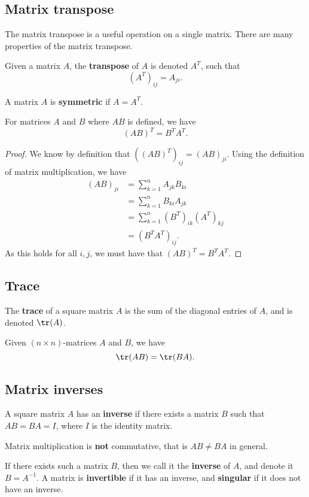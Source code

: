 \documentclass[a4paper]{article}
\begin{document}
\subsection{Matrix transpose}
The matrix transpose is a useful operation on a single matrix. There are many properties of the matrix transpose.
\begin{definition}
  Given a matrix $A$, the \textbf{transpose} of $A$ is denoted $A^T$, such that \[
    (A^T)_{ij} = A_{ji}
  .\] 
\end{definition}
\begin{definition}
  A matrix $A$ is \textbf{symmetric} if $A = A^T$.
\end{definition}
\begin{theorem}
  For matrices $A$ and $B$ where $AB$ is defined, we have  \[
    (AB)^T = B^TA^T
  .\] 
\end{theorem}
\begin{proof}
  We know by definition that $((AB)^T)_{ij} = (AB)_{ji}$. Using the definition of matrix multiplication, we have 
  \begin{align*}
    (AB)_{ji} &= \sum_{k = 1}^{n} A_{jk}B_{ki} \\
              &= \sum_{k=1}^{n} B_{ki}A_{jk} \\
              &= \sum_{k=1}^{n} (B^T)_{ik}(A^T)_{kj} \\
              &= (B^TA^T)_{ij}.
  \end{align*}
  As this holds for all $i, j$, we must have that $(AB)^T = B^TA^T$.
\end{proof}
\subsection{Trace}
The \textbf{trace} of a square matrix $A$ is the sum of the diagonal entries of $A$, and is denoted $\tr(A)$.
\begin{theorem}
  Given $(n\times n)$-matrices $A$ and $B$, we have \[
    \tr(AB) = \tr(BA)
  .\] 
\end{theorem}
\subsection{Matrix inverses}
A square matrix $A$ has an \textbf{inverse} if there exists a matrix $B$ such that $AB = BA = I$, where $I$ is the identity matrix.
\begin{remark}
  Matrix multiplication is \textbf{not} commutative, that is $AB \neq BA$ in general.
\end{remark}
If there exists such a matrix $B$, then we call it the \textbf{inverse} of $A$, and denote it $B = A^{-1}$. A matrix is \textbf{invertible} if it has an inverse, and \textbf{singular} if it does not have an inverse.
\end{document}
